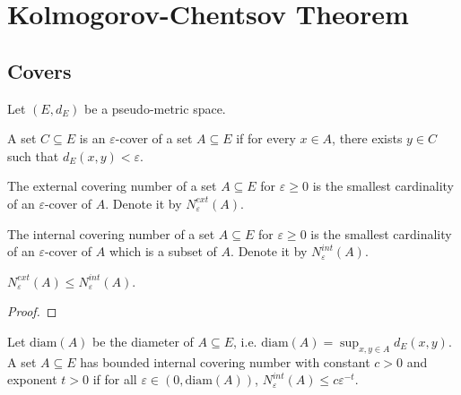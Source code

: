 \chapter{Kolmogorov-Chentsov Theorem}
\label{chap:kolmogorov_chentsov}

\section{Covers}

Let $(E, d_E)$ be a pseudo-metric space.

\begin{definition}\label{def:IsCover}
  \leanok
  A set $C \subseteq E$ is an $\varepsilon$-cover of a set $A \subseteq E$ if for every $x \in A$, there exists $y \in C$ such that $d_E(x, y) < \varepsilon$.
\end{definition}


\begin{definition}\label{def:externalCoveringNumber}
  \leanok
  The external covering number of a set $A \subseteq E$ for $\varepsilon \ge 0$ is the smallest cardinality of an $\varepsilon$-cover of $A$.
  Denote it by $N^{ext}_\varepsilon(A)$.
\end{definition}


\begin{definition}\label{def:internalCoveringNumber}
  \leanok
  The internal covering number of a set $A \subseteq E$ for $\varepsilon \ge 0$ is the smallest cardinality of an $\varepsilon$-cover of $A$ which is a subset of $A$.
  Denote it by $N^{int}_\varepsilon(A)$.
\end{definition}


\begin{lemma}\label{lem:externalCoveringNumber_le_internalCoveringNumber}
  \leanok
$N^{ext}_\varepsilon(A) \le N^{int}_\varepsilon(A)$.
\end{lemma}

\begin{proof}\leanok

\end{proof}


\begin{definition}\label{def:HasBoundedInternalCoveringNumber}
  Let $\mathrm{diam}(A)$ be the diameter of $A \subseteq E$, i.e. $\mathrm{diam}(A) = \sup_{x,y \in A} d_E(x, y)$.
  A set $A \subseteq E$ has bounded internal covering number with constant $c>0$ and exponent $t>0$ if for all $\varepsilon \in (0, \mathrm{diam}(A))$, $N^{int}_\varepsilon(A) \le c \varepsilon^{-t}$.
\end{definition}


